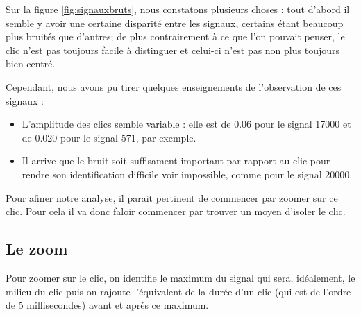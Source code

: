 Sur la figure \ref{fig:signauxbruts}, nous constatons plusieurs choses : tout d'abord il semble y avoir une certaine disparité entre les signaux, certains étant beaucoup plus bruités que d'autres; de plus contrairement à ce que l'on pouvait penser, le clic n'est pas toujours facile à distinguer et celui-ci n'est pas non plus toujours bien centré.

Cependant, nous avons pu tirer quelques enseignements de l'observation de ces signaux :
\begin{itemize}
\item L'amplitude des clics semble variable : elle est de 0.06 pour le signal 17000 et de 0.020 pour le signal 571, par exemple.
\item Il arrive que le bruit soit suffisament important par rapport au clic pour rendre son identification difficile voir impossible, comme pour le signal 20000.
\end{itemize}

Pour afiner notre analyse, il parait pertinent de commencer par zoomer sur ce clic.
Pour cela il va donc faloir commencer par trouver un moyen d'isoler le clic.

\hypertarget{Le-zoom}{%
\subsection{Le zoom}
\label{Le-zoom}}

Pour zoomer sur le clic, on identifie le maximum du signal qui sera, idéalement, le milieu du clic puis on rajoute l'équivalent de la durée d'un clic (qui est de l'ordre de 5 millisecondes) avant et aprés ce maximum.



